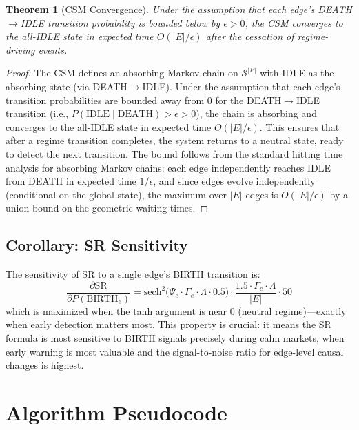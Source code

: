 \documentclass[11pt]{article}
\newtheorem{theorem}{Theorem}
\newcommand{\SR}{\mathrm{SR}}
\begin{document}
\begin{theorem}[CSM Convergence]
Under the assumption that each edge's DEATH$\to$IDLE transition probability is bounded below by $\epsilon > 0$, the CSM converges to the all-IDLE state in expected time $O(|E|/\epsilon)$ after the cessation of regime-driving events.
\end{theorem}

\begin{proof}
The CSM defines an absorbing Markov chain on $\mathcal{S}^{|E|}$ with IDLE as the absorbing state (via DEATH$\to$IDLE). Under the assumption that each edge's transition probabilities are bounded away from 0 for the DEATH$\to$IDLE transition (i.e., $P(\text{IDLE} \mid \text{DEATH}) > \epsilon > 0$), the chain is absorbing and converges to the all-IDLE state in expected time $O(|E| / \epsilon)$. This ensures that after a regime transition completes, the system returns to a neutral state, ready to detect the next transition. The bound follows from the standard hitting time analysis for absorbing Markov chains: each edge independently reaches IDLE from DEATH in expected time $1/\epsilon$, and since edges evolve independently (conditional on the global state), the maximum over $|E|$ edges is $O(|E|/\epsilon)$ by a union bound on the geometric waiting times.
\end{proof}

\subsection{Corollary: SR Sensitivity}

The sensitivity of SR to a single edge's BIRTH transition is:
\begin{equation}
    \frac{\partial \SR}{\partial P(\text{BIRTH}_e)} = \text{sech}^2\!\bigl(\overline{\Psi_e \cdot \Gamma_e} \cdot \Lambda \cdot 0.5\bigr) \cdot \frac{1.5 \cdot \Gamma_e \cdot \Lambda}{|E|} \cdot 50
\end{equation}
which is maximized when the tanh argument is near 0 (neutral regime)---exactly when early detection matters most. This property is crucial: it means the SR formula is most sensitive to BIRTH signals precisely during calm markets, when early warning is most valuable and the signal-to-noise ratio for edge-level causal changes is highest.

\section{Algorithm Pseudocode}
\end{document}
